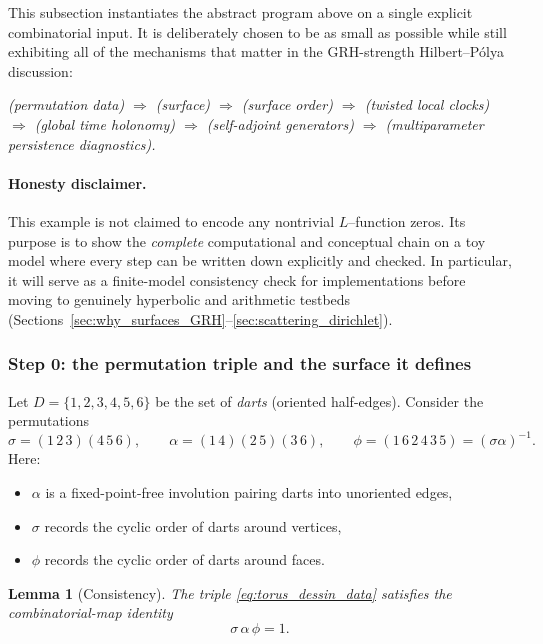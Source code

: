 \documentclass[11pt,oneside]{amsbook}
\numberwithin{equation}{section}
\theoremstyle{plain}
\newtheorem{lemma}[theorem]{Lemma}
\theoremstyle{definition}
\theoremstyle{remark}
\begin{document}
This subsection instantiates the abstract program above on a single explicit combinatorial input.
It is deliberately chosen to be as small as possible while still exhibiting all of the mechanisms that matter in the GRH-strength Hilbert--Pólya discussion:
\begin{center}
\emph{(permutation data) $\Rightarrow$ (surface) $\Rightarrow$ (surface order) $\Rightarrow$ (twisted local clocks) $\Rightarrow$ (global time holonomy) $\Rightarrow$ (self-adjoint generators) $\Rightarrow$ (multiparameter persistence diagnostics).}
\end{center}

\paragraph{Honesty disclaimer.}
This example is not claimed to encode any nontrivial $L$--function zeros.
Its purpose is to show the \emph{complete} computational and conceptual chain on a toy model where every step can be written down explicitly and checked.
In particular, it will serve as a finite-model consistency check for implementations before moving to genuinely hyperbolic and arithmetic testbeds (Sections~\ref{sec:why_surfaces_GRH}--\ref{sec:scattering_dirichlet}).

\subsubsection{Step 0: the permutation triple and the surface it defines}

Let $D=\{1,2,3,4,5,6\}$ be the set of \emph{darts} (oriented half-edges).
Consider the permutations
\begin{equation}
\label{eq:torus_dessin_data}
\sigma=(1\,2\,3)(4\,5\,6),\qquad 
\alpha=(1\,4)(2\,5)(3\,6),
\qquad 
\phi=(1\,6\,2\,4\,3\,5)=(\sigma\alpha)^{-1}.
\end{equation}
Here:
\begin{itemize}
\item $\alpha$ is a fixed-point-free involution pairing darts into unoriented edges,
\item $\sigma$ records the cyclic order of darts around vertices,
\item $\phi$ records the cyclic order of darts around faces.
\end{itemize}

\begin{lemma}[Consistency]
\label{lem:torus_saph}
The triple \eqref{eq:torus_dessin_data} satisfies the combinatorial-map identity
\[
\sigma\,\alpha\,\phi=1.
\]
\end{lemma}
\end{document}
